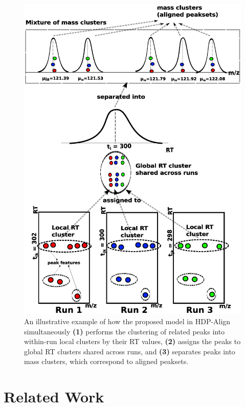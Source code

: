 \begin{figure}[!htbp]
\centering\includegraphics[width=0.50\linewidth]{06-hdp/figures/figure_1.eps}
\centering\caption[An illustrative example of how the proposed model in HDP-Align works.]{An illustrative example of how the proposed model in HDP-Align simultaneously \textbf{(1)} performs the clustering of related peaks into within-run local clusters by their RT values, \textbf{(2)} assigns the peaks to global \ac{RT} clusters shared across runs, and \textbf{(3)} separates peaks into mass clusters, which correspond to aligned peaksets.\label{fig-hdp-cartoon}}
\end{figure}

\section{Related Work}

